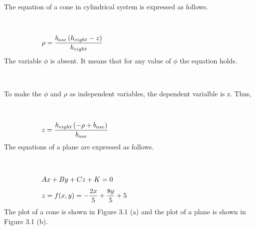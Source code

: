 \documentclass[10pt,a4paper,leqno]{article}
\begin{document}
\begin{CJK*}{UTF8}{gbsn}
 \par \ \par\noindent The equation of a cone in cylindrical system is expressed as follows.
 \par \ \par\begin{equation}
 \begin{minipage}{250pt}
                \begin{flushleft} $\displaystyle \rho = \frac{b_{ase} \left(h_{eight} - z\right)}{h_{eight}}$  \end{flushleft}
 \end{minipage}
 \end{equation}
\noindent The variable $\phi$ is absent. It means that for any value of $\phi$ the equation holds.
 \par \ \par\noindent To make the $\phi$ and $\rho$ as independent variables, the dependent varialble is z. Thus,
 \par \ \par\begin{equation}
 \begin{minipage}{250pt}
                \begin{flushleft} $\displaystyle z = \frac{h_{eight} \left(- \rho + b_{ase}\right)}{b_{ase}}$  \end{flushleft}
 \end{minipage}
 \end{equation}
\noindent The equations of a plane are expressed as follows.
 \par \ \par\begin{equation}
 \begin{minipage}{250pt}
                \begin{flushleft} $\displaystyle A x + B y + C z + K = 0$  \end{flushleft}
 \end{minipage}
 \end{equation}
\begin{equation}
 \begin{minipage}{250pt}
                \begin{flushleft} $\displaystyle z = f{\left(x,y \right)} = - \frac{2 x}{5} + \frac{8 y}{5} + 5$  \end{flushleft}
 \end{minipage}
 \end{equation}
\noindent The plot of a cone is shown in Figure 3.1 (a) and the plot of a plane is shown in Figure 3.1 (b).

\end{CJK*}
\end{document}
